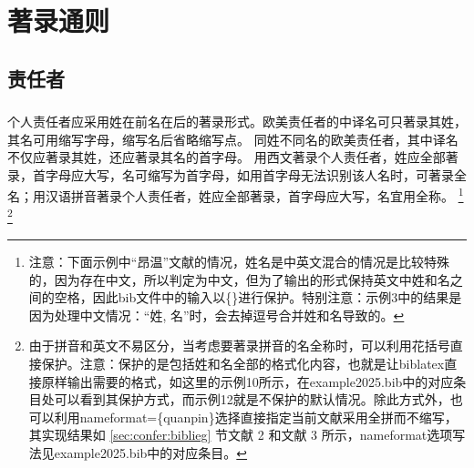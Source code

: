 \documentclass[twoside]{article}%
\begin{document}
\section{著录通则}\label{sec:biblio:rule}
\subsection{责任者}
\subsubsection{}\label{sec:author:fisrt} 个人责任者应采用姓在前名在后的著录形式。欧美责任者的中译名可只著录其姓，其名可用缩写字母，缩写名后省略缩写点。
同姓不同名的欧美责任者，其中译名不仅应著录其姓，还应著录其名的首字母。 用西文著录个人责任者，姓应全部著录，首字母应大写，名可缩写为首字母，如用首字母无法识别该人名时，可著录全名；用汉语拼音著录个人责任者，姓应全部著录，首字母应大写，名宜用全称。
\footnote{注意：下面示例中“昂温”文献的情况，姓名是中英文混合的情况是比较特殊的，因为存在中文，所以判定为中文，但为了输出的形式保持英文中姓和名之间的空格，因此bib文件中的输入以\{\}进行保护。特别注意：示例3中的结果是因为处理中文情况：“姓, 名”时，会去掉逗号合并姓和名导致的。}
\footnote{由于拼音和英文不易区分，当考虑要著录拼音的名全称时，可以利用花括号直接保护。注意：保护的是包括姓和名全部的格式化内容，也就是让biblatex直接原样输出需要的格式，如这里的示例10所示，在example2025.bib中的对应条目处可以看到其保护方式，而示例12就是不保护的默认情况。除此方式外，也可以利用nameformat=\{quanpin\}选择直接指定当前文献采用全拼而不缩写，
其实现结果如 \ref{sec:confer:biblieg} 节文献 2 和文献 3 所示，nameformat选项写法见example2025.bib中的对应条目。}

\begin{refsection}

\nocite{李时珍--}
\nocite{乔纳斯--}
\nocite{昂温1988--}
\nocite{GPS1988--}
\nocite{丸山敏秋--}
\nocite{凯西尔--}
\nocite{Einstein--}
\nocite{Williams-ellis--}
\nocite{morgan--}
\nocite{lijianning--a}
\nocite{Godard--}
\nocite{lijianning--b}

{}
\end{refsection}
\end{document}
